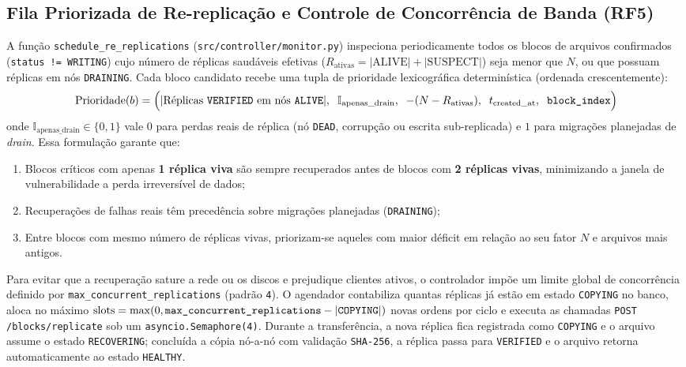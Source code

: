 \documentclass[10pt,a4paper]{article}
\begin{document}
\subsection{Fila Priorizada de Re-replicação e Controle de Concorrência de Banda (RF5)}
A função \texttt{schedule\_re\_replications} (\texttt{src/controller/monitor.py}) inspeciona periodicamente todos os blocos de arquivos confirmados (\texttt{status != WRITING}) cujo número de réplicas saudáveis efetivas ($R_{\text{ativas}} = |\text{ALIVE}| + |\text{SUSPECT}|$) seja menor que $N$, ou que possuam réplicas em nós \texttt{DRAINING}. Cada bloco candidato recebe uma tupla de prioridade lexicográfica determinística (ordenada crescentemente):
\[
    \text{Prioridade}(b) = \Big( |\text{Réplicas \texttt{VERIFIED} em nós \texttt{ALIVE}}|,\;\; \mathbb{I}_{\text{apenas\_drain}},\;\; -(N - R_{\text{ativas}}),\;\; t_{\text{created\_at}},\;\; \text{\texttt{block\_index}} \Big)
\]
onde $\mathbb{I}_{\text{apenas\_drain}} \in \{0, 1\}$ vale $0$ para perdas reais de réplica (nó \texttt{DEAD}, corrupção ou escrita sub-replicada) e $1$ para migrações planejadas de \textit{drain}. Essa formulação garante que:
\begin{enumerate}
    \item Blocos críticos com apenas \textbf{1 réplica viva} são sempre recuperados antes de blocos com \textbf{2 réplicas vivas}, minimizando a janela de vulnerabilidade a perda irreversível de dados;
    \item Recuperações de falhas reais têm precedência sobre migrações planejadas (\texttt{DRAINING});
    \item Entre blocos com mesmo número de réplicas vivas, priorizam-se aqueles com maior déficit em relação ao seu fator $N$ e arquivos mais antigos.
\end{enumerate}

Para evitar que a recuperação sature a rede ou os discos e prejudique clientes ativos, o controlador impõe um limite global de concorrência definido por \texttt{max\_concurrent\_replications} (padrão \texttt{4}). O agendador contabiliza quantas réplicas já estão em estado \texttt{COPYING} no banco, aloca no máximo $\text{slots} = \max(0, \text{\texttt{max\_concurrent\_replications}} - |\text{\texttt{COPYING}}|)$ novas ordens por ciclo e executa as chamadas \texttt{POST /blocks/replicate} sob um \texttt{asyncio.Semaphore(4)}. Durante a transferência, a nova réplica fica registrada como \texttt{COPYING} e o arquivo assume o estado \texttt{RECOVERING}; concluída a cópia nó-a-nó com validação \texttt{SHA-256}, a réplica passa para \texttt{VERIFIED} e o arquivo retorna automaticamente ao estado \texttt{HEALTHY}.
\end{document}
